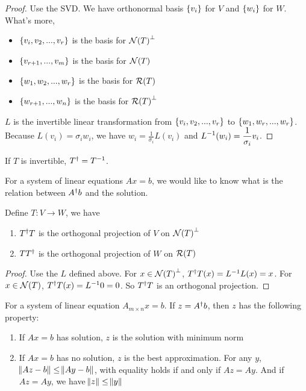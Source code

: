 \begin{proof}
    Use the SVD. We have orthonormal basis $\set{v_i}$ for $V$ and $\set{w_i}$ for $W$. What's more,
    \begin{itemize}
        \item $\set{v_i, v_2, ..., v_r}$ is the basis for $\nullspace{T}^\perp$
        \item $\set{v_{r+1}, ..., v_m}$ is the basis for $\nullspace{T}$
        \item $\set{w_1, w_2, ..., w_r}$ is the basis for $\rangespace{T}$
        \item $\set{w_{r+1}, ..., w_n}$ is the basis for $\rangespace{T}^\perp$
    \end{itemize}
    
    $L$ is the invertible linear transformation from $\set{v_i, v_2, ..., v_r}$ to $\set{w_1, w_r, ..., w_r}$. Because $L(v_i) = \sigma_i w_i$, we have $\displaystyle w_i = \frac{1}{\sigma_i}L(v_i)$ and $\displaystyle {L}^{-1}(w_i) = \frac{1}{\sigma_i} v_i$.
\end{proof}

If $T$ is invertible, ${T}^\dagger = {T}^{-1}$.


For a system of linear equations $Ax=b$, we would like to know what is the relation between ${A}^\dagger b$ and the solution.

\begin{theorem}
    Define $T:V \rightarrow W$, we have
    \begin{enumerate}
        \item ${T}^\dagger T$ is the orthogonal projection of $V$ on $\nullspace{T}^\perp$
        \item $T {T}^\dagger$ is the orthogonal projection of $W$ on $\rangespace{T}$
    \end{enumerate}
\end{theorem}
\begin{proof}
    Use the $L$ defined above. For $x \in \nullspace{T}^\perp$, ${T}^\dagger T(x) = {L}^{-1}L(x) = x$. For $x \in \nullspace{T}$, ${T}^\dagger T(x) = {L}^{-1} 0 = 0$. So ${T}^\dagger T$ is an orthogonal projection.
\end{proof}

\begin{theorem}
    For a system of linear equation $A_{m \times n}x=b$. If $z = {A}^\dagger b$, then $z$ has the following property:
    \begin{enumerate}
        \item If $Ax=b$ has solution, $z$ is the solution with minimum norm
        \item If $Ax=b$ has no solution, $z$ is the best approximation. For any $y$, $\norm{Az-b} \leq \norm{Ay-b}$, with equality holds if and only if $Az = Ay$. And if $Az = Ay$, we have $\norm{z} \leq \norm{y}$
    \end{enumerate}
\end{theorem}

